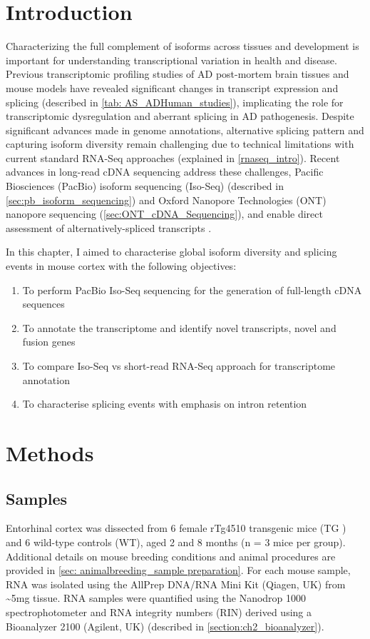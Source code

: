 \section{Introduction}
Characterizing the full complement of isoforms across tissues and development is important for understanding transcriptional variation in health and disease. Previous transcriptomic profiling studies of AD post-mortem brain tissues and mouse models have revealed significant changes in transcript expression and splicing (described in \cref{tab: AS_ADHuman_studies}), implicating the role for transcriptomic dysregulation and aberrant splicing in AD pathogenesis\cite{Raj2018}. Despite significant advances made in genome annotations, alternative splicing pattern and capturing isoform diversity remain challenging due to technical limitations with current standard RNA-Seq approaches (explained in \cref{rnaseq_intro}). Recent advances in long-read cDNA sequencing address these challenges, Pacific Biosciences (PacBio) isoform sequencing (Iso-Seq) (described in \cref{sec:pb_isoform_sequencing}) and Oxford Nanopore Technologies (ONT) nanopore sequencing (\cref{sec:ONT_cDNA_Sequencing}), and enable direct assessment of alternatively-spliced transcripts \cite{Amarasinghe2020a}.

\newpage
In this chapter, I aimed to characterise global isoform diversity and splicing events in mouse cortex with the following objectives:
\begin{enumerate}
	\item To perform PacBio Iso-Seq sequencing for the generation of full-length cDNA sequences 
	\item To annotate the transcriptome and identify novel transcripts, novel and fusion genes  
	\item To compare Iso-Seq vs short-read RNA-Seq approach for transcriptome annotation 
	\item To characterise splicing events with emphasis on intron retention 	
\end{enumerate} 

\section{Methods}
\subsection{Samples}
Entorhinal cortex was dissected from 6 female rTg4510 transgenic mice (TG ) and 6 wild-type controls (WT), aged 2 and 8 months (n = 3 mice per group). Additional details on mouse breeding conditions and animal procedures are provided in \cref{sec: animalbreeding_sample preparation}. For each mouse sample, RNA was isolated using the AllPrep DNA/RNA Mini Kit (Qiagen, UK) from \textasciitilde5mg tissue. RNA samples were quantified using the Nanodrop 1000 spectrophotometer and RNA integrity numbers (RIN) derived using a Bioanalyzer 2100 (Agilent, UK) (described in \cref{section:ch2_bioanalyzer}). 

